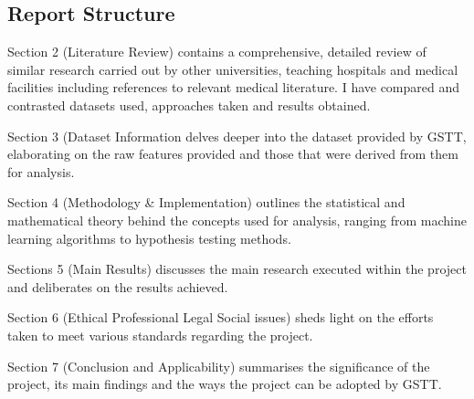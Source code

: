 \subsection{Report Structure}
\par{ \noindent Section 2 (Literature Review) contains a comprehensive, detailed review of similar research carried out by other universities, teaching hospitals and medical facilities including references to relevant medical literature. I have compared and contrasted datasets used, approaches taken and results obtained.}
\par{\noindent Section 3 (Dataset Information delves deeper into the dataset provided by GSTT, elaborating on the raw features provided and those that were derived from them for analysis.}
\par{\noindent Section 4 (Methodology \& Implementation) outlines the statistical and mathematical theory behind the concepts used for analysis, ranging from machine learning algorithms to hypothesis testing methods.}
\par{\noindent Sections 5 (Main Results) discusses the main research executed within the project and deliberates on the results achieved.}
\par{\noindent Section 6 (Ethical Professional Legal Social issues) sheds light on the efforts taken to meet various standards regarding the project.}
\par{\noindent Section 7 (Conclusion and Applicability) summarises the significance of the project, its main findings and the ways the project can be adopted by GSTT.}






	

